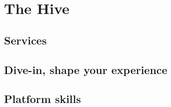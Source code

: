 \section{The Hive}


\subsection{Services} %


\subsection{Dive-in, shape your experience} %


\subsection{Platform skills} %


